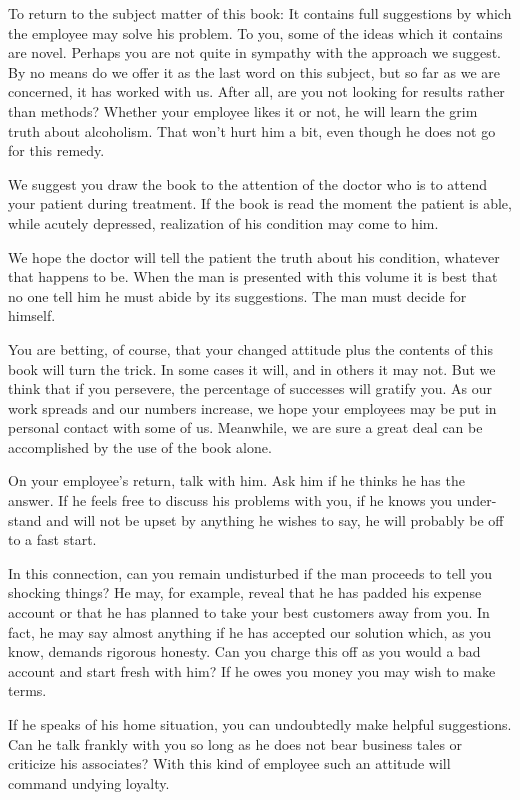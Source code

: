 \begin{biblechapter}
To return to the subject matter of this book:  It contains full suggestions by which the employee may solve his problem.  To you, some of the ideas which it contains are novel.  Perhaps you are not quite in sympathy with the approach we suggest.  By no means do we offer it as the last word on this subject, but so far as we are concerned, it has worked with us.  After all, are you not looking for results rather than methods?  Whether your employee likes it or not, he will learn the grim truth about alcoholism.  That won't hurt him a bit, even though he does not go for this remedy.

We suggest you draw the book to the attention of the doctor who is to attend your patient during treatment.  If the book is read the moment the patient is able, while acutely depressed, realization of his condition may come to him.

We hope the doctor will tell the patient the truth about his condition, whatever that happens to be.  When the man is presented with this volume it is best that no one tell him he must abide by its suggestions.  The man must decide for himself.

You are betting, of course, that your changed attitude plus the contents of this book will turn the trick.  In some cases it will, and in others it may not.  But we think that if you persevere, the percentage of successes will gratify you.  As our work spreads and our numbers increase, we hope your employees may be put in personal contact with some of us.  Meanwhile, we are sure a great deal can be accomplished by the use of the book alone.

On your employee's return, talk with him.  Ask him if he thinks he has the answer.  If he feels free to discuss his problems with you, if he knows you under-stand and will not be upset by anything he wishes to say, he will probably be off to a fast start.

In this connection, can you remain undisturbed if the man proceeds to tell you shocking things?  He may, for example, reveal that he has padded his expense account or that he has planned to take your best customers away from you.  In fact, he may say almost anything if he has accepted our solution which, as you know, demands rigorous honesty.  Can you charge this off as you would a bad account and start fresh with him?  If he owes you money you may wish to make terms.

If he speaks of his home situation, you can undoubtedly make helpful suggestions.  Can he talk frankly with you so long as he does not bear business tales or criticize his associates?  With this kind of employee such an attitude will command undying loyalty.


\end{biblechapter}
